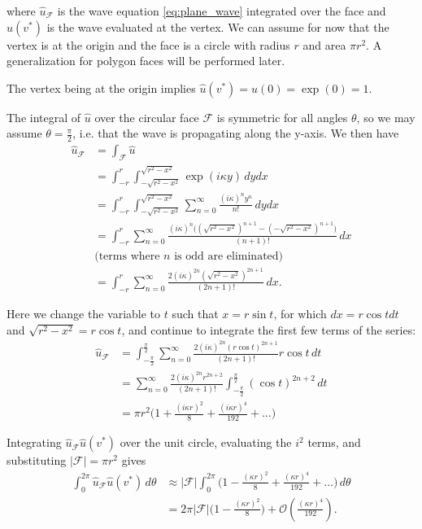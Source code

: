 \documentclass[utf8,english]{gradu3}
\begin{document}
where $\hat{u}_{\mathcal{F}}$ is the wave equation \eqref{eq:plane_wave}
integrated over the face and $\hat{u}(v^*)$ is the wave evaluated at the vertex.
We can assume for now that the vertex is at the origin
and the face is a circle with radius $r$ and area $\pi r^2$.
A generalization for polygon faces will be performed later.

The vertex being at the origin implies $\hat{u}(v^*) = \hat{u}(0) = \exp(0) = 1$.

The integral of $\hat{u}$ over the circular face $\mathcal{F}$ is
symmetric for all angles $\theta$, so we may assume $\theta = \frac{\pi}{2}$,
i.e. that the wave is propagating along the y-axis.
We then have
\begin{align*}
  \hat{u}_{\mathcal{F}} &= \int_{\mathcal{F}} \hat{u} \\
  &= \int_{-r}^{r} \int_{-\sqrt{r^2 - x^2}}^{\sqrt{r^2 - x^2}}
    \exp(i\kappa y) \,dydx \\
  &= \int_{-r}^{r} \int_{-\sqrt{r^2 - x^2}}^{\sqrt{r^2 - x^2}}
    \sum_{n=0}^{\infty} \frac{(i\kappa)^n y^n}{n!} \,dydx \\
  &= \int_{-r}^{r} \sum_{n=0}^{\infty}
    \frac{(i\kappa)^n \Big((\sqrt{r^2 - x^2})^{n+1} - (-\sqrt{r^2 - x^2})^{n+1} \Big)}{(n + 1)!} \,dx \\
  &\text{(terms where $n$ is odd are eliminated)} \\
  &= \int_{-r}^{r} \sum_{n=0}^{\infty} \frac{2 (i\kappa)^{2n} (\sqrt{r^2 - x^2})^{2n+1}}{(2n + 1)!} \,dx.
\end{align*}

Here we change the variable to $t$ such that $x = r\sin t$,
for which $dx = r\cos t dt$ and $\sqrt{r^2 - x^2} = r\cos t$,
and continue to integrate the first few terms of the series:
\begin{align*}
\hat{u}_{\mathcal{F}}
&= \int_{-\frac{\pi}{2}}^{\frac{\pi}{2}}
  \sum_{n=0}^{\infty} \frac{2(i\kappa)^{2n} (r\cos t)^{2n+1}}{(2n + 1)!} r\cos t \,dt \\
&= \sum_{n=0}^{\infty} \frac{2(i\kappa)^{2n} r^{2n+2}}{(2n + 1)!}
  \int_{-\frac{\pi}{2}}^{\frac{\pi}{2}} (\cos t)^{2n+2} \,dt \\
&= \pi r^2 \Big( 1 + \frac{(i\kappa r)^2}{8} + \frac{(i\kappa r)^4}{192} + \dots \Big)
\end{align*}

Integrating $\hat{u}_{\mathcal{F}} \hat{u}(v^*)$ over the unit circle,
evaluating the $i^2$ terms,
and substituting $|\mathcal{F}| = \pi r^2$ gives
\begin{align*}
\int_{0}^{2\pi} \hat{u}_{\mathcal{F}} \hat{u}(v^*) \,d\theta
&\approx |\mathcal{F}| \int_{0}^{2\pi}
  \Big( 1 - \frac{(\kappa r)^2}{8} + \frac{(\kappa r)^4}{192} + \dots \Big) \,d\theta \\
&= 2\pi |\mathcal{F}| \Big( 1 - \frac{(\kappa r)^2}{8} \Big)
+ \mathcal{O}(\frac{(\kappa r)^4}{192}).
\end{align*}
\end{document}
